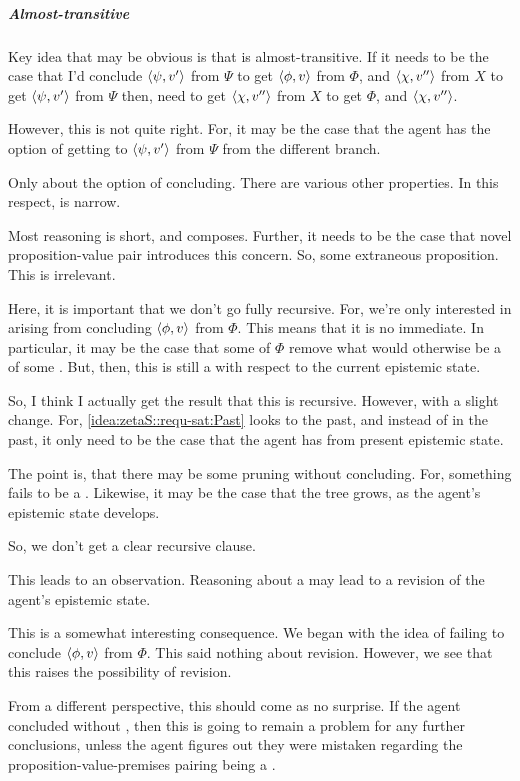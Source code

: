 \subparagraph*{Almost-transitive}

\begin{note}
  Key idea that may be obvious is that \zetaS{} is almost-transitive.
  If it needs to be the case that I'd conclude \(\langle \psi, v' \rangle\) from \(\Psi\) to get \(\langle \phi, v \rangle\) from \(\Phi\), and \(\langle \chi, v'' \rangle\) from \(X\) to get \(\langle \psi, v' \rangle\) from \(\Psi\) then, need to get \(\langle \chi, v'' \rangle\) from \(X\) to get \(\Phi\), and \(\langle \chi, v'' \rangle\).

  However, this is not quite right.
  For, it may be the case that the agent has the option of getting to \(\langle \psi, v' \rangle\) from \(\Psi\) from the different branch.
\end{note}

\begin{note}
  Only about the option of concluding.
  There are various other properties.
  In this respect, \qzS{} is narrow.
\end{note}

\begin{note}
  Most reasoning is short, and composes.
  Further, it needs to be the case that novel proposition-value pair introduces this concern.
  So, some extraneous proposition.
  This is irrelevant.
\end{note}

\begin{note}[Recursion]
   {
    \color{red}
    Here, it is important that we don't go fully recursive.
    For, we're only interested in  arising from concluding \(\langle \phi, v \rangle\) from \(\Phi\).
    This means that it is no immediate.
    In particular, it may be the case that some of \(\Phi\) remove what would otherwise be a \requ{} of some \requ{}.
    But, then, this is still a \requ{} with respect to the current epistemic state.

    So, I think I actually get the result that this is recursive.
    However, with a slight change.
    For, \ref{idea:zetaS::requ-sat:Past} looks to the past, and instead of \csVImp{} in the past, it only need to be the case that the agent has \csVed{} from present epistemic state.

    The point is, that there may be some pruning without concluding.
    For, something fails to be a \requ{}.
    Likewise, it may be the case that the tree grows, as the agent's epistemic state develops.

    So, we don't get a clear recursive clause.

    This leads to an observation.
    Reasoning about a \requ{} may lead to a revision of the agent's epistemic state.

    This is a somewhat interesting consequence.
    We began with the idea of failing to conclude \(\langle \phi, v \rangle\) from \(\Phi\).
    This said nothing about revision.
    However, we see that this raises the possibility of revision.

    From a different perspective, this should come as no surprise.
    If the agent concluded without \csN{}, then this is going to remain a problem for any further conclusions, unless the agent figures out they were mistaken regarding the proposition-value-premises pairing being a \requ{}.
  }
\end{note}


